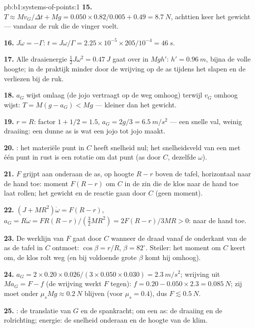 \begin{solution}{pb:b1:systems-of-points:1}
\textbf{15.} $T \approx Mv_G/\Delta t + Mg = 0.050 \times 0.82/0.005 + 0.49 =
\qty{8.7}{N}$, achttien keer het gewicht --- vandaar de ruk die de vinger
voelt.

\textbf{16.} $J\dot\omega = -\Gamma$: $t = J\omega/\Gamma = 2.25\times10^{-5} \times
205/10^{-4} = \qty{46}{s}$.

\textbf{17.} Alle draaienergie $\tfrac12 J\omega^2 = \qty{0.47}{J}$ gaat over
in $Mgh'$: $h' = \qty{0.96}{m}$, bijna de volle hoogte; in de praktijk minder
door de wrijving op de as tijdens het slapen en de verliezen bij de
ruk.

\textbf{18.} $a_G$ wijst omlaag (de jojo vertraagt op de weg omhoog) terwijl
$v_G$ omhoog wijst: $T = M(g - a_G) < Mg$ --- kleiner dan het gewicht.

\textbf{19.} $r = R$: factor $1 + 1/2 = 1.5$, $a_G = 2g/3 = \qty{6.5}{m/s^2}$
--- een snelle val, weinig draaiing: een dunne as is wat een jojo tot jojo maakt.

\textbf{20.} : het materiële punt in $C$ heeft snelheid
nul; het snelheidsveld van een  met één punt in rust is
een rotatie om dat punt (as door $C$, dezelfde $\omega$).

\textbf{21.} $F$ grijpt aan onderaan de as, op hoogte $R - r$ boven
de tafel, horizontaal naar de hand toe: moment $F(R - r)$ om $C$ in
de zin die de klos naar de hand toe laat rollen; het gewicht en de
reactie gaan door $C$ (geen moment).

\textbf{22.} $(J + MR^2)\dot\omega = F(R - r)$, $a_G = R\dot\omega = FR(R - r)/
(\tfrac32 MR^2) = 2F(R - r)/3MR > 0$: naar de hand toe.

\textbf{23.} De werklijn van $F$ gaat door $C$ wanneer de draad
vanaf de onderkant van de as de tafel in $C$ ontmoet: $\cos\beta = r/R$,
$\beta = 82^\circ$. Steiler: het moment om $C$ keert om, de klos rolt
weg (en bij voldoende grote $\beta$ komt hij omhoog).

\textbf{24.} $a_G = 2 \times 0.20 \times 0.026/(3 \times 0.050 \times 0.030) =
\qty{2.3}{m/s^2}$; wrijving uit $Ma_G = F - f$ (de wrijving werkt $F$ tegen):
$f = 0.20 - 0.050 \times 2.3 = \qty{0.085}{N}$; zij moet onder $\mu_sMg
\approx \qty{0.2}{N}$ blijven (voor $\mu_s = 0.4$), dus $F \lesssim \qty{0.5}{N}$.

\textbf{25.} : de translatie van $G$ en de spankracht;
 om een as: de draaiing en de rolrichting;
energie: de snelheid onderaan en de hoogte van de klim.
\end{solution}

